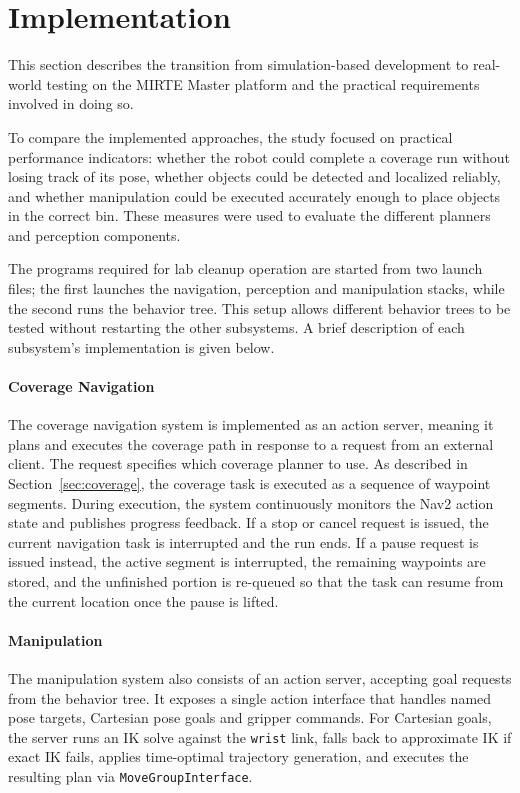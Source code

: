 \section{Implementation}

    This section describes the transition from simulation-based development to real-world testing on the MIRTE Master platform and the practical requirements involved in doing so.

    To compare the implemented approaches, the study focused on practical performance indicators: whether the robot could complete a coverage run without losing track of its pose, whether objects could be detected and localized reliably, and whether manipulation could be executed accurately enough to place objects in the correct bin. These measures were used to evaluate the different planners and perception components.

    The programs required for lab cleanup operation are started from two launch files; the first launches the navigation, perception and manipulation stacks, while the second runs the behavior tree. This setup allows different behavior trees to be tested without restarting the other subsystems. A brief description of each subsystem's implementation is given below.

    \paragraph{Coverage Navigation}
    The coverage navigation system is implemented as an action server, meaning it plans and executes the coverage path in response to a request from an external client. The request specifies which coverage planner to use. As described in Section~\ref{sec:coverage}, the coverage task is executed as a sequence of waypoint segments. During execution, the system continuously monitors the Nav2 action state and publishes progress feedback. If a stop or cancel request is issued, the current navigation task is interrupted and the run ends. If a pause request is issued instead, the active segment is interrupted, the remaining waypoints are stored, and the unfinished portion is re-queued so that the task can resume from the current location once the pause is lifted.

    \paragraph{Manipulation}
    The manipulation system also consists of an action server, accepting goal requests from the behavior tree. It exposes a single action interface that handles named pose targets, Cartesian pose goals and gripper commands. For Cartesian goals, the server runs an IK solve against the \texttt{wrist} link, falls back to approximate IK if exact IK fails, applies time-optimal trajectory generation, and executes the resulting plan via \texttt{MoveGroupInterface}.


